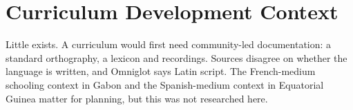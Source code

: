 \documentclass[12pt]{article}
\begin{document}
\section{Curriculum Development Context}
Little exists. A curriculum would first need community-led documentation: a standard orthography, a lexicon and recordings. Sources disagree on whether the language is written, and Omniglot says Latin script. The French-medium schooling context in Gabon and the Spanish-medium context in Equatorial Guinea matter for planning, but this was not researched here.
\end{document}
